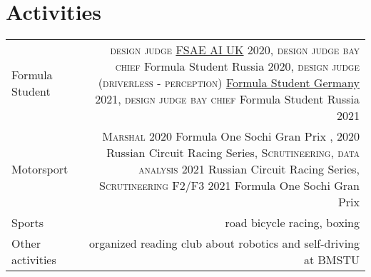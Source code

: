 \section*{\sectionformat Activities}
\begin{tabular}{@{}L!{\VRule}R}
    Formula Student  & {\textsc{design judge}} \href{https://www.imeche.org/events/formula-student/team-information/fs-ai}{FSAE AI UK} 2020,
    {\textsc{design judge bay chief}} Formula Student Russia 2020,
    {\textsc{design judge (driverless - perception)}} \href{https://www.formulastudent.de/fsg/}{Formula Student Germany} 2021,
    {\textsc{design judge bay chief}} Formula Student Russia 2021                                                                            \\
    Motorsport       & {\textsc{Marshal}} 2020 Formula One Sochi Gran Prix , 2020 Russian Circuit Racing Series,
    {\textsc{Scrutineering, data analysis}} 2021 Russian Circuit Racing Series,
    {\textsc{Scrutineering F2/F3}} 2021 Formula One Sochi Gran Prix                                                                          \\
    Sports           & road bicycle racing, boxing                                                                                           \\
    Other activities & organized reading club about robotics and self-driving at BMSTU
\end{tabular}